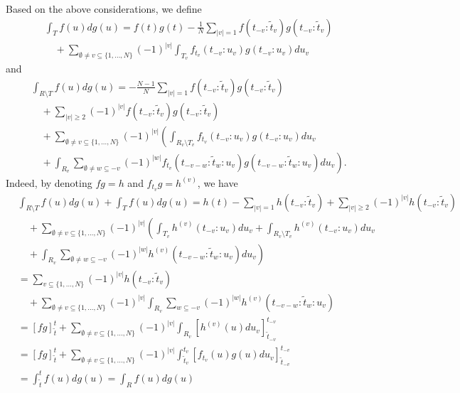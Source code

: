 \documentclass[english, a4paper, 12pt,reqno]{amsart}
\begin{document}
Based on the above considerations, we define
\begin{equation}
\begin{split}
\label{T>0}
&\int_T f(u) dg(u) 
= f(t)g(t) - \frac{1}{N} \sum_{|v|=1} f(t_{-v}:\tilde{t}_v)g(t_{-v}:\tilde{t}_v)\\ &\quad + \sum_{\emptyset\neq v \subseteq \{1,\dots,N\}} (-1)^{|v|}\int_{T_v} f_{t_v}(t_{-v}:u_v) g(t_{-v}:u_v)du_v
\end{split}
\end{equation}
and 
\begin{equation*}
\begin{split}
&\int_{R \setminus T} f(u) dg(u) = - \frac{N-1}{N} \sum_{|v|=1} f(t_{-v}:\tilde{t}_v)g(t_{-v}:\tilde{t}_v)\\
&\quad + \sum_{|v| \geq 2} (-1)^{|v|} f(t_{-v}:\tilde{t}_v)g(t_{-v}:\tilde{t}_v)\\
&\quad + \sum_{\emptyset\neq v \subseteq \{1,\dots,N\}} (-1)^{|v|}\left(\int_{R_v\setminus T_v}  f_{t_v}(t_{-v}:u_v) g(t_{-v}:u_v)du_v \right.\\
&\quad + \left. \int_{R_v} \sum_{\emptyset \neq w \subseteq -v} (-1)^{|w|} f_{t_v}(t_{-v-w}: \tilde{t}_w:u_v) g(t_{-v-w}: \tilde{t}_w:u_v) du_v \right).
\end{split}
\end{equation*}
Indeed, by denoting $fg = h$ and $f_{t_v}g = h^{(v)}$, we have 
\begin{equation*}
\begin{split}
&\int_{R \setminus T} f(u) dg(u) + \int_{ T} f(u) dg(u) = h(t) - \sum_{|v|=1} h(t_{-v}:\tilde{t}_v) + \sum_{|v|\geq 2} (-1)^{|v|}h(t_{-v}:\tilde{t}_v)\\
&\quad + \sum_{\emptyset\neq v \subseteq \{1,\dots,N\}} (-1)^{|v|}\left( \int_{T_v} h^{(v)}(t_{-v}:u_v) du_v + \int_{R_v\setminus T_v}  h^{(v)}(t_{-v}:u_v)du_v\right. \\
&\quad + \left. \int_{R_v} \sum_{\emptyset \neq w \subseteq -v} (-1)^{|w|} h^{(v)}(t_{-v-w}: \tilde{t}_w:u_v)  du_v\right)\\
&= \sum_{v \subseteq \{1,\dots,N\}} (-1)^{|v|} h(t_{-v}:\tilde{t}_v)\\
&\quad + \sum_{\emptyset\neq v \subseteq \{1,\dots,N\}} (-1)^{|v|}\int_{R_v} \sum_{w\subseteq -v} (-1)^{|w|} h^{(v)}(t_{-v-w}: \tilde{t}_w:u_v)\\
&= [fg]_{\tilde{t}}^t + \sum_{\emptyset\neq v \subseteq \{1,\dots,N\}} (-1)^{|v|} \int_{R_v} \left[ h^{(v)}(u) du_v\right]_{\tilde{t}_{-v}}^{t_{-v}}\\
&= [fg]_{\tilde{t}}^t +  \sum_{\emptyset\neq v \subseteq \{1,\dots,N\}} (-1)^{|v|} \int_{\tilde{t}_v}^{t_v}  \left[f_{t_v}(u) g(u) du_v \right]_{\tilde{t}_{-v}}^{t_{-v}}\\ 
&= \int_{\tilde{t}}^t f(u) dg(u)= \int_R f(u) dg(u)
\end{split}
\end{equation*}
\end{document}

